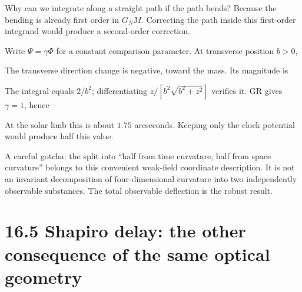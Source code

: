 \documentclass[
  11pt,
  letterpaper,
  oneside,
  openany]{scrbook}
\begin{document}
Why can we integrate along a straight path if the path bends? Because
the bending is already first order in \(G_NM\). Correcting the path
inside this first-order integrand would produce a second-order
correction.

Write \(\Psi=\gamma\Phi\) for a constant comparison parameter. At
transverse position \(b>0\),

\begin{center}
\begingroup
{}
\ifdim\wd\grmathbox>\linewidth
\resizebox{\linewidth}{!}{\usebox{\grmathbox}}
\else\usebox{\grmathbox}\fi
\endgroup
\end{center}

The transverse direction change is negative, toward the mass. Its
magnitude is

\begin{center}
\begingroup
{}
\ifdim\wd\grmathbox>\linewidth
\resizebox{\linewidth}{!}{\usebox{\grmathbox}}
\else\usebox{\grmathbox}\fi
\endgroup
\end{center}

The integral equals \(2/b^2\); differentiating \(z/[b^2\sqrt{b^2+z^2}]\)
verifies it. GR gives \(\gamma=1\), hence

\begin{center}
\begingroup
{}
\ifdim\wd\grmathbox>\linewidth
\resizebox{\linewidth}{!}{\usebox{\grmathbox}}
\else\usebox{\grmathbox}\fi
\endgroup
\end{center}

At the solar limb this is about \(1.75\) arcseconds. Keeping only the
clock potential would produce half this value.

A careful gotcha: the split into ``half from time curvature, half from
space curvature'' belongs to this convenient weak-field coordinate
description. It is not an invariant decomposition of four-dimensional
curvature into two independently observable substances. The total
observable deflection is the robust result.

\hypertarget{shapiro-delay-the-other-consequence-of-the-same-optical-geometry}{%
\section{16.5 Shapiro delay: the other consequence of the same optical
geometry}\label{shapiro-delay-the-other-consequence-of-the-same-optical-geometry}}
\end{document}
